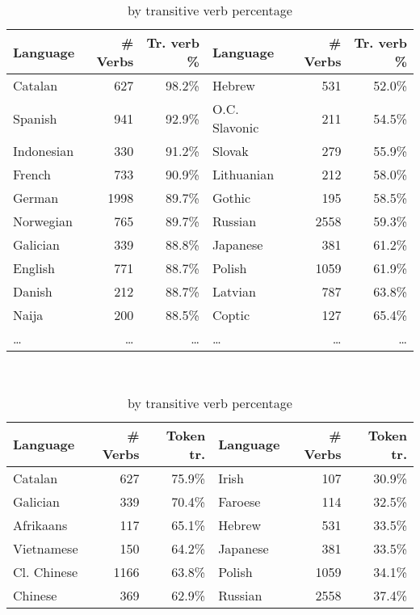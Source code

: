 \begin{table}[ht]
    \centering
    \small
    \begin{subtable}[c]{\textwidth}
      \centering
      \begin{tabular}{lrr|lrr}
        \toprule
        Language & \# Verbs & Tr. verb \% & Language & \# Verbs & Tr. verb \% \\
        \midrule
        Catalan & 627 & 98.2\% & Hebrew & 531 & 52.0\% \\
        Spanish & 941 & 92.9\% & O.C. Slavonic & 211 & 54.5\% \\
        Indonesian & 330 & 91.2\% & Slovak & 279 & 55.9\% \\
        French & 733 & 90.9\% & Lithuanian & 212 & 58.0\% \\
        German & 1998 & 89.7\% & Gothic & 195 & 58.5\% \\
        Norwegian & 765 & 89.7\% & Russian & 2558 & 59.3\% \\
        Galician & 339 & 88.8\% & Japanese & 381 & 61.2\% \\
        English & 771 & 88.7\% & Polish & 1059 & 61.9\% \\
        Danish & 212 & 88.7\% & Latvian & 787 & 63.8\% \\
        Naija & 200 & 88.5\% & Coptic & 127 & 65.4\% \\
        \dots & \dots & \dots & \dots & \dots & \dots \\
        \bottomrule
      \end{tabular}
      \caption{by transitive verb percentage}
      \label{tab:table1}
    \end{subtable}\\
    \begin{subtable}[c]{\textwidth}
      \centering
      \begin{tabular}{lrr|lrr}
        \toprule
        Language & \# Verbs & Token tr. & Language & \# Verbs & Token tr. \\
        \midrule
        Catalan & 627 & 75.9\% & Irish & 107 & 30.9\% \\
        Galician & 339 & 70.4\% & Faroese & 114 & 32.5\% \\
        Afrikaans & 117 & 65.1\% & Hebrew & 531 & 33.5\% \\
        Vietnamese & 150 & 64.2\% & Japanese & 381 & 33.5\% \\
        Cl. Chinese & 1166 & 63.8\% & Polish & 1059 & 34.1\% \\
        Chinese & 369 & 62.9\% & Russian & 2558 & 37.4\% \\

\end{tabular}
\end{subtable}
\end{table}
